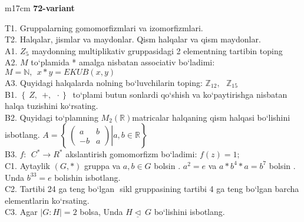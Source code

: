 \documentclass{article}
\begin{document}
\vspace{1cm}


\begin{tabular}{m{17cm}}
\textbf{72-variant}
\newline

T1. Gruppalarning gomomorfizmlari va izomorfizmlari. \\
T2. Halqalar, jismlar va maydonlar. Qism halqalar va qism maydonlar. \\
A1. \(Z_{5}\) maydonning multiplikativ gruppasidagi 2 elementning tartibin toping \\
A2. \(M\) to`plamida * amalga nisbatan associativ bo`ladimi: \(M\mathbb{= N},\ \ x*y = EKUB(x,y)\) \\
A3. Quyidagi halqalarda nolning bo`luvchilarin toping: \(\mathbb{Z}_{12},\ \ \ \mathbb{Z}_{15}\) \\
B1. \(\left\{ \left. \ Z,\ \  + ,\ \  \cdot \right\} \right.\ \) to`plami butun sonlardi qo`shish va ko`paytirishga nisbatan halqa tuzishini ko`rsating. \\
B2. Quyidagi to`plamning \(M_{2}(\mathbb{R})\)matricalar halqaning qism halqasi bo`lishini isbotlang. \(A = \left\{ \left. \ \begin{pmatrix}
a & b \\
 - b & a
\end{pmatrix} \right|a,b\mathbb{\in R} \right\}\) \\
B3. \(f:\ \ C^{*} \rightarrow R^{*}\) akslantirish gomomorfizm bo`ladimi: \(f(z) = 1;\) \\
C1. Aytaylik \((G,*)\) gruppa va \(a,b \in G\) bo\textquotesingle lsin . \(a^{2} = e\) va \(a*b^{4}*a = b^{7}\) bo\textquotesingle lsin . Unda \(b^{33} = e\) bolishin isbotlang. \\
C2. Tartibi 24 ga teng bo`lgan \(< a >\) sikl gruppasining tartibi 4 ga teng bo`lgan barcha elementlarin ko`rsating. \\
C3. Agar \(|G:H| = 2\) bolsa, Unda \(H\underline{\vartriangleleft}\ G\) bo`lishini isbotlang. \\

\end{tabular}
\vspace{1cm}
\end{document}

